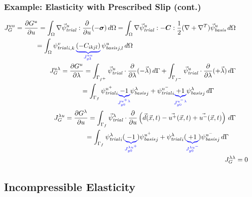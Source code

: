 \documentclass[aspectratio=169]{beamer}
\begin{document}
\begin{frame}
  \frametitle{Example: Elasticity with Prescribed Slip (cont.)}
  \summary{}

  \vspace*{-18pt}
\begin{align}
  \begin{split}
  J_G^{uu} &= \frac{\partial G^u}{\partial u} = \int_\Omega \nabla \trialvec[u] : 
\frac{\partial}{\partial u}(-
\tensor{\sigma}) \, d\Omega 
  = \int_\Omega \nabla \trialvec[u] : -\tensor{C} : \frac{1}{2}(\nabla + \nabla^T)\basisvec[u] 
             \, d\Omega \\
&\quad\quad\quad  = \int_\Omega \trialscalar[v]_{i,k} \, \eqnannotate{\left( -C_{ikjl}
    \right)}{J_{g3}^{uu}} \, \basisscalar[u]_{j,l}\,
  d\Omega \end{split} \\
  \begin{split}
J_G^{u\lambda} &= \frac{\partial G^u}{\partial \lambda} =
\int_{\Gamma_{f^+}} \trialvec[u] \cdot \frac{\partial}{\partial \lambda}(-\vec{\lambda}) \, d\Gamma
+ \int_{\Gamma_{f^-}} \trialvec[u] \cdot \frac{\partial}{\partial \lambda}(+\vec{\lambda}) \, d\Gamma \\
& \quad\quad\quad = \int_{\Gamma_{f}} \trialscalar[u^+]_i \eqnannotate{-1}{J_{g0}^{u^+\lambda}}\basisscalar[\lambda]_j + \trialscalar[u^-]_i \eqnannotate{+1}{J_{g0}^{u^-\lambda}}\basisscalar[\lambda]_j \, d\Gamma
\end{split} \\
\begin{split}
J_G^{\lambda u} &= \frac{\partial G^\lambda}{\partial u} =
\int_{\Gamma_{f}} \trialvec[\lambda] \cdot \frac{\partial}{\partial u}\left(\vec{d}(\vec{x},t) - \vec{u^+}(\vec{x},t) + \vec{u^-}(\vec{x},t) \right) \, d\Gamma \\
&\quad\quad\quad = \int_{\Gamma_{f}} \trialscalar[\lambda]_i (\eqnannotate{-1}{J_{g0}^{\lambda u^+}})\basisscalar[u^+]_j
+ \trialscalar[\lambda]_i (\eqnannotate{+1}{J_{g0}^{\lambda u^-}})\basisscalar[u^-]_j \, d\Gamma
\end{split} \\
%
  J_G^{\lambda \lambda} &= 0
\end{align}

\end{frame}

\subsection{Incompressible Elasticity}
\end{document}
